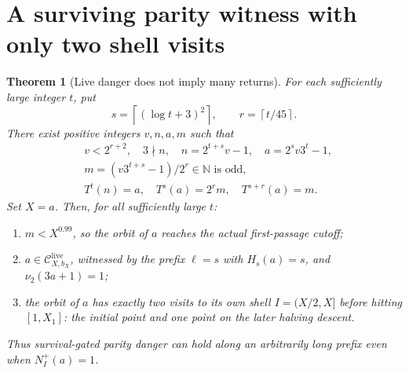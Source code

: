 \documentclass[11pt,a4paper]{article}
\newtheorem{theorem}{Theorem}
\newcommand{\N}{\mathbb N}
\newcommand{\calC}{\mathcal C}
\begin{document}
\section{A surviving parity witness with only two shell visits}
\begin{theorem}[Live danger does not imply many returns]\label{thm:family}
For each sufficiently large integer $t$, put
\[
 s=\left\lceil(\log t+3)^2\right\rceil,\qquad
 r=\left\lceil t/45\right\rceil.
\]
There exist positive integers $v,n,a,m$ such that
\begin{align*}
 &v<2^{r+2},\quad 3\nmid n,\quad
 n=2^{t+s}v-1,\quad a=2^s v3^t-1,\\
 &m=(v3^{t+s}-1)/2^r\in\N\text{ is odd},\\
 &T^t(n)=a,\quad T^s(a)=2^rm,\quad T^{s+r}(a)=m.
\end{align*}
Set $X=a$. Then, for all sufficiently large $t$:
\begin{enumerate}
\item $m<X^{0.99}$, so the orbit of $a$ reaches the actual
first-passage cutoff;
\item $a\in\calC^{\mathrm{live}}_{X,b_X}$, witnessed by the prefix
$\ell=s$ with $H_s(a)=s$, and $\nu_2(3a+1)=1$;
\item the orbit of $a$ has \emph{exactly two} visits to its own shell
$I=(X/2,X]$ before hitting $[1,X_1]$: the initial point and one
point on the later halving descent.
\end{enumerate}
Thus survival-gated parity danger can hold along an arbitrarily long
prefix even when $N_I^+(a)=1$.
\end{theorem}
\end{document}
